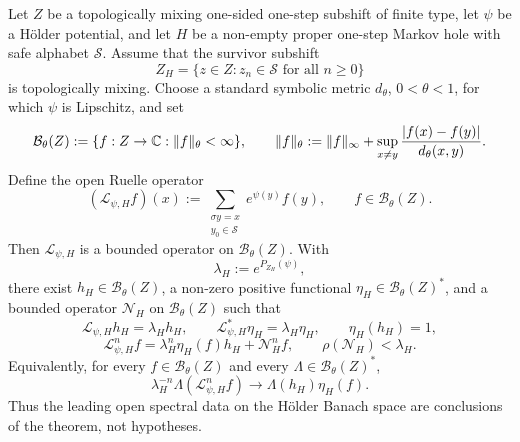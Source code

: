 \begin{theorem}
\label{thm:holder-open-transfer}
Let \(Z\) be a topologically mixing one-sided one-step subshift of finite
type, let \(\psi\) be a H\"older potential, and let \(H\) be a
non-empty proper one-step Markov hole with safe alphabet \(\mathcal S\).
Assume that the survivor subshift
\[
  Z_H=\{z\in Z:z_n\in\mathcal S\text{ for all }n\geq0\}
\]
is topologically mixing.  Choose a standard symbolic metric
\(d_\theta\), \(0<\theta<1\), for which \(\psi\) is Lipschitz, and set
\[
  \mathcal B_\theta(Z):=
  \{f:Z\to\mathbb C:\lVert f\rVert_\theta<\infty\},
  \qquad
  \lVert f\rVert_\theta:=\lVert f\rVert_\infty+
  \sup_{x\neq y}\frac{\lvert f(x)-f(y)\rvert}{d_\theta(x,y)} .
\]
Define the open Ruelle operator
\[
  (\mathcal L_{\psi,H}f)(x)
  :=
  \sum_{\substack{\sigma y=x\\ y_0\in\mathcal S}}
    e^{\psi(y)}f(y),
  \qquad f\in\mathcal B_\theta(Z).
\]
Then \(\mathcal L_{\psi,H}\) is a bounded operator on
\(\mathcal B_\theta(Z)\).  With
\[
  \lambda_H:=e^{P_{Z_H}(\psi)},
\]
there exist \(h_H\in\mathcal B_\theta(Z)\), a non-zero positive
functional \(\eta_H\in\mathcal B_\theta(Z)^*\), and a bounded operator
\(\mathcal N_H\) on \(\mathcal B_\theta(Z)\) such that
\[
  \mathcal L_{\psi,H}h_H=\lambda_H h_H,\qquad
  \mathcal L_{\psi,H}^*\eta_H=\lambda_H\eta_H,\qquad
  \eta_H(h_H)=1,
\]
\[
  \mathcal L_{\psi,H}^n f
  =
  \lambda_H^n\eta_H(f)h_H+\mathcal N_H^n f,
  \qquad
  \rho(\mathcal N_H)<\lambda_H .
\]
Equivalently, for every \(f\in\mathcal B_\theta(Z)\) and every
\(\Lambda\in\mathcal B_\theta(Z)^*\),
\[
  \lambda_H^{-n}\Lambda(\mathcal L_{\psi,H}^n f)
  \longrightarrow
  \Lambda(h_H)\eta_H(f).
\]
Thus the leading open spectral data on the H\"older Banach space are
conclusions of the theorem, not hypotheses.
\end{theorem}

